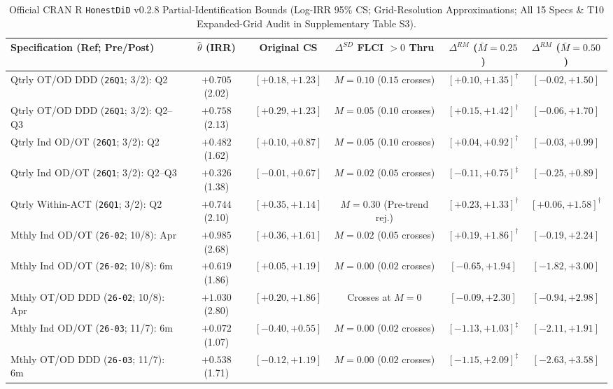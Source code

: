 \documentclass[11pt,letterpaper]{article}
\begin{document}
\begin{table}[H]
\centering
\caption{Official CRAN R \texttt{HonestDiD} v0.2.8 Partial-Identification Bounds (Log-IRR 95\% CS; Grid-Resolution Approximations; All 15 Specs \& T10 Expanded-Grid Audit in Supplementary Table S3).}
\label{tab:b2_honestdid}
\footnotesize
\setlength{\tabcolsep}{3.5pt}
\begin{tabularx}{\textwidth}{@{} >{\raggedright\arraybackslash}X c c c c c @{}}
\toprule
\textbf{Specification (Ref; Pre/Post)} & \textbf{$\hat{\theta}$ (IRR)} & \textbf{Original CS} & \textbf{$\Delta^{SD}$ FLCI $>0$ Thru} & \textbf{$\Delta^{RM}$ ($\bar{M}=0.25$)} & \textbf{$\Delta^{RM}$ ($\bar{M}=0.50$)} \\
\midrule
Qtrly OT/OD DDD (\texttt{26Q1}; 3/2): Q2 & $+0.705$ (2.02) & $[+0.18, +1.23]$ & $M=0.10$ ($0.15$ crosses) & $[+0.10, +1.35]^\dagger$ & $[-0.02, +1.50]$ \\
Qtrly OT/OD DDD (\texttt{26Q1}; 3/2): Q2--Q3 & $+0.758$ (2.13) & $[+0.29, +1.23]$ & $M=0.05$ ($0.10$ crosses) & $[+0.15, +1.42]^\dagger$ & $[-0.06, +1.70]$ \\
Qtrly Ind OD/OT (\texttt{26Q1}; 3/2): Q2 & $+0.482$ (1.62) & $[+0.10, +0.87]$ & $M=0.05$ ($0.10$ crosses) & $[+0.04, +0.92]^\dagger$ & $[-0.03, +0.99]$ \\
Qtrly Ind OD/OT (\texttt{26Q1}; 3/2): Q2--Q3 & $+0.326$ (1.38) & $[-0.01, +0.67]$ & $M=0.02$ ($0.05$ crosses) & $[-0.11, +0.75]^\ddagger$ & $[-0.25, +0.89]$ \\
Qtrly Within-ACT (\texttt{26Q1}; 3/2): Q2 & $+0.744$ (2.10) & $[+0.35, +1.14]$ & $M=0.30$ (Pre-trend rej.) & $[+0.23, +1.33]^\dagger$ & $[+0.06, +1.58]^\dagger$ \\
\midrule
Mthly Ind OD/OT (\texttt{26-02}; 10/8): Apr & $+0.985$ (2.68) & $[+0.36, +1.61]$ & $M=0.02$ ($0.05$ crosses) & $[+0.19, +1.86]^\dagger$ & $[-0.19, +2.24]$ \\
Mthly Ind OD/OT (\texttt{26-02}; 10/8): 6m & $+0.619$ (1.86) & $[+0.05, +1.19]$ & $M=0.00$ ($0.02$ crosses) & $[-0.65, +1.94]$ & $[-1.82, +3.00]$ \\
Mthly OT/OD DDD (\texttt{26-02}; 10/8): Apr & $+1.030$ (2.80) & $[+0.20, +1.86]$ & Crosses at $M=0$ & $[-0.09, +2.30]$ & $[-0.94, +2.98]$ \\
Mthly Ind OD/OT (\texttt{26-03}; 11/7): 6m & $+0.072$ (1.07) & $[-0.40, +0.55]$ & $M=0.00$ ($0.02$ crosses) & $[-1.13, +1.03]^\ddagger$ & $[-2.11, +1.91]$ \\
Mthly OT/OD DDD (\texttt{26-03}; 11/7): 6m & $+0.538$ (1.71) & $[-0.12, +1.19]$ & $M=0.00$ ($0.02$ crosses) & $[-1.15, +2.09]^\ddagger$ & $[-2.63, +3.58]$ \\

\end{tabularx}
\end{table}
\end{document}
